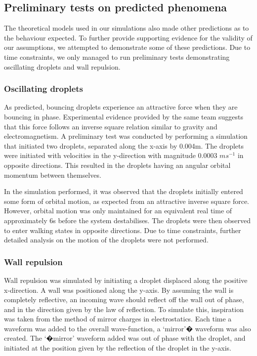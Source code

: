 \subsection{Preliminary tests on predicted phenomena}
The theoretical models used in our simulations also made other predictions as to the behaviour expected. To further provide supporting evidence for the validity of our  assumptions, we attempted to demonstrate some of these predictions. Due to time constraints, we only managed to run preliminary tests demonstrating oscillating droplets and wall repulsion.

\subsubsection{Oscillating droplets}

As predicted, \cite{brady2014bouncing} bouncing droplets experience an attractive force when they are bouncing in phase. Experimental evidence provided by the same team suggests that this force follows an inverse square relation similar to gravity and electromagnetism. A preliminary test was conducted by performing a simulation that initiated two droplets, separated along the x-axis by 0.004m. The droplets were initiated with velocities in the y-direction with magnitude 0.0003 $ms^{-1}$ in opposite directions. This resulted in the droplets having an angular orbital momentum between themselves.

In the simulation performed, it was observed that the droplets initially entered some form of orbital motion, as expected from an attractive inverse square force. However, orbital motion was only maintained for an equivalent real time of approximately 6s before the system destabilises. The droplets were then observed to enter walking states in opposite directions. Due to time constraints, further detailed analysis on the motion of the droplets were not performed. 

\subsubsection{Wall repulsion}

Wall repulsion was simulated by initiating a droplet displaced along the positive x-direction. A wall was positioned along the y-axis. By assuming the wall is completely reflective, an incoming wave should reflect off the wall out of phase, and in the direction given by the law of reflection. To simulate this, inspiration was taken from the method of mirror charges in electrostatics. Each time a waveform was added to the overall wave-function, a `mirror'� waveform was also created. The `�mirror' waveform added was out of phase with the droplet, and initiated at the position given by the reflection of the droplet in the y-axis.

